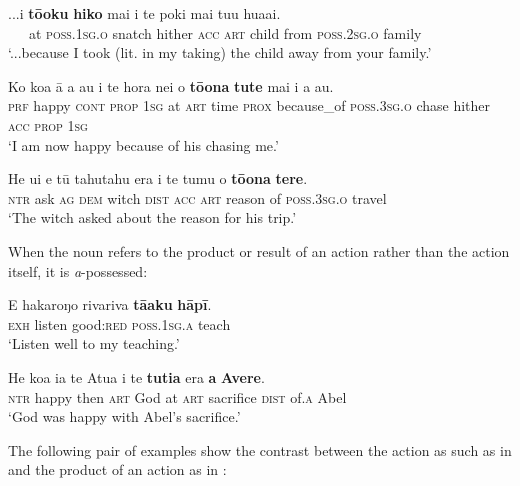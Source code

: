 \ea\label{ex:6.104}
\gll ...{\ꞌ}i \textbf{tō{\ꞌ}oku} \textbf{hiko} mai i te poki mai tu{\ꞌ}u hua{\ꞌ}ai. \\
~~~at \textsc{poss.1sg.o} snatch hither \textsc{acc} \textsc{art} child from \textsc{poss.2sg.o} family \\

\glt 
‘...because I took (lit. in my taking) the child away from your family.’ \textstyleExampleref{[R229.027]} 
\z

\ea\label{ex:6.105}
\gll Ko koa {\ꞌ}ā a au {\ꞌ}i te hora nei {\ꞌ}o \textbf{tō{\ꞌ}ona} \textbf{tute} mai  i a au.\\
\textsc{prf} happy \textsc{cont} \textsc{prop} \textsc{1sg} at \textsc{art} time \textsc{prox} because\_of \textsc{poss.3sg.o} chase hither  \textsc{acc} \textsc{prop} \textsc{1sg}\\

\glt 
‘I am now happy because of his chasing me.’ \textstyleExampleref{[R214.053]} 
\z

\ea\label{ex:6.106}
\gll He {\ꞌ}ui e tū tahutahu era i te tumu o \textbf{tō{\ꞌ}ona} \textbf{tere}. \\
\textsc{ntr} ask \textsc{ag} \textsc{dem} witch \textsc{dist} \textsc{acc} \textsc{art} reason of \textsc{poss.3sg.o} travel \\

\glt
‘The witch asked about the reason for his trip.’ \textstyleExampleref{[R532-07.043]}
\z

When the noun refers to the product or result of an action rather than the action itself, it is \textit{a}{}-possessed:

\ea\label{ex:6.107}
\gll E hakaroŋo rivariva \textbf{tā{\ꞌ}aku} \textbf{hāpī}. \\
\textsc{exh} listen good:\textsc{red} \textsc{poss.1sg.a} teach \\

\glt 
‘Listen well to my teaching.’ \textstyleExampleref{[Luke 8:18]}
\z

\ea\label{ex:6.108}
\gll He koa ia te {\ꞌ}Atua {\ꞌ}i te \textbf{tutia} era \textbf{{\ꞌ}a} \textbf{{\ꞌ}Avere}. \\
\textsc{ntr} happy then \textsc{art} God at \textsc{art} sacrifice \textsc{dist} of\textsc{.a} Abel \\

\glt
‘God was happy with Abel’s sacrifice.’ \textstyleExampleref{[Gen. 4:4]}
\z

The following pair of examples show the contrast between the action as such as in  and the product of an action as in :


